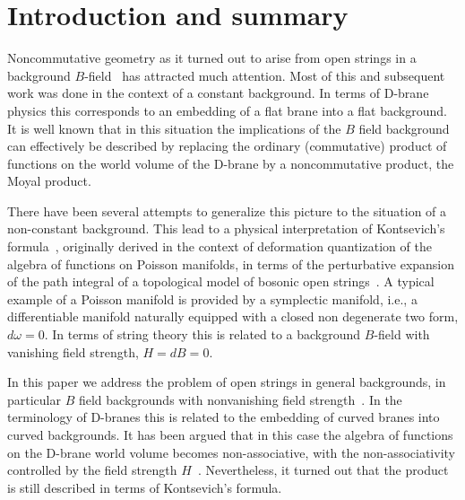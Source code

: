 \documentclass[a4paper,12pt]{article}
\begin{document}
\clearpage
\setcounter{page}{1}



\section{Introduction and summary}
\label{sec:intro}

Noncommutative geometry as it turned out to arise from open strings in a 
background $B$-field~\cite{Connes:1998cr,Douglas:1998fm,Ardalan:1999ce,
Chu:1999qz,Schomerus:1999ug,Ardalan:2000av,Chu:2000gi,Seiberg:1999vs} has 
attracted much attention. 
Most of this and subsequent work was done in the context 
of a constant background. In terms of D-brane physics this corresponds to 
an embedding of a flat brane into a flat background. 
It is well known that in this situation the implications of the $B$ field 
background can effectively be described by replacing the ordinary 
(commutative) product of functions on the world volume of the D-brane 
by a noncommutative product, the Moyal product. 

There have been several attempts to generalize this picture to the 
situation of a non-constant background. This lead to a physical 
interpretation of Kontsevich's formula~\cite{Kontsevich:1997vb}, originally 
derived in the context of deformation quantization of the algebra of 
functions on Poisson manifolds,
in terms of the 
perturbative expansion of the path integral of a topological model 
of bosonic open strings~\cite{Cattaneo:2000fm}. A typical example of a 
Poisson manifold is provided by a symplectic manifold, i.e., a differentiable 
manifold naturally equipped with a closed non degenerate two form, 
$d\omega =0$. 
In terms of string theory this is related to a background $B$-field with 
vanishing field strength, $H=d B=0$. 

In this paper we address the problem of open strings in general backgrounds, 
in particular $B$ field backgrounds with nonvanishing field 
strength~\cite{Ho:2000fv,Cornalba:2001sm,Ho:2001qk}. In the
terminology of D-branes this is related to the embedding of curved branes 
into curved backgrounds. It has been argued that in this case the 
algebra of functions on the D-brane world volume becomes non-associative, 
with the non-associativity controlled by the field strength 
$H$~\cite{Cornalba:2001sm}. Nevertheless, it turned out that the product is 
still described in terms of Kontsevich's formula. 
\end{document}
